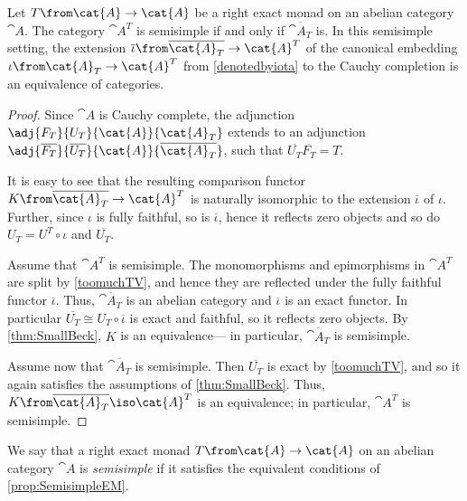\begin{proposition}\label{prop:SemisimpleEM}
  Let \(T\from \cat{A} \to \cat{A}\) be a right exact monad on an abelian category \(\cat{A}\).
  The category \(\cat{A}^T\) is semisimple if and only if
  \(\overline{\cat{A}_T}\) is.
  In this semisimple setting, the extension \(\overline{\iota}\from \overline{\cat{A}_T} \to \cat{A}^T\)
  of the canonical embedding \(\iota\from \cat{A}_T \to \cat{A}^T\) from \cref{denotedbyiota}
  to the Cauchy completion is an equivalence of categories.
\end{proposition}
\begin{proof}
  Since \(\cat{A}\) is Cauchy complete, the adjunction \(\adj{F_{T}}{U_T}{\cat{A}}{\cat{A}_T}\)
  extends to an adjunction \(\adj{\overline{F_{T}}}{\overline{U_{T}}}{\cat{A}}{\overline{\cat{A}_{T}}}\),
  such that \(\overline{U_T} \overline{F_T} = T\).

  It is easy to see that the resulting comparison functor \(K\from \overline{\cat{A}_T} \to \cat{A}^T\) is naturally isomorphic to the extension \(\overline{\iota}\) of \(\iota\).
  Further, since \(\iota\) is fully faithful, so is \(\overline{\iota}\), hence it reflects zero objects and so do \(U_T = U^T \circ \iota\)
  and \(\overline{U_T}\).

  Assume that \(\cat{A}^T\) is semisimple.
  The monomorphisms and epimorphisms in \(\cat{A}^T\) are split by \cref{toomuchTV},
  and hence they are reflected under the fully faithful functor \(\overline{\iota}\).
  Thus, \(\overline{\cat{A}_T}\) is an abelian category and \(\overline{\iota}\) is an exact functor.
  In particular \(\overline{U_T} \cong U_T \circ \overline{\iota}\) is exact and faithful,
  so it reflects zero objects.
  By \cref{thm:SmallBeck}, \(K\) is an equivalence—%
  in particular, \(\overline{\cat{A}_T}\) is semisimple.

  Assume now that \(\overline{\cat{A}_T}\) is semisimple.
  Then \(\overline{U_T}\) is exact by \cref{toomuchTV},
  and so it again satisfies the assumptions of \cref{thm:SmallBeck}.
  Thus, \(K\from \overline{\cat{A}_T} \iso \cat{A}^T\) is an equivalence;
  in particular, \(\cat{A}^T\) is semisimple.
\end{proof}

\begin{definition}\label{def:semisimple-monad}
  We say that a right exact monad \(T\from \cat{A} \to \cat{A}\) on an abelian category \(\cat{A}\) is \emph{semisimple}
  if it satisfies the equivalent conditions of \cref{prop:SemisimpleEM}.
\end{definition}


